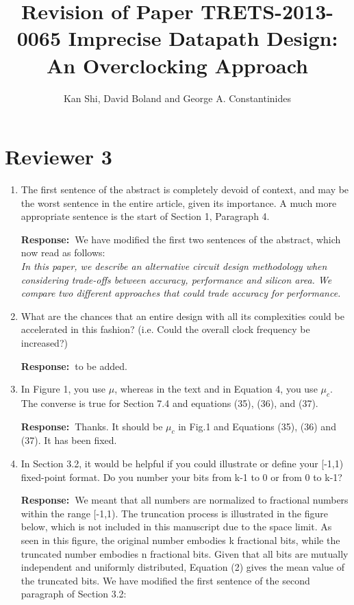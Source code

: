\documentclass[a4paper, 11pt]{article}
\title{Revision of Paper TRETS-2013-0065 Imprecise Datapath Design: An Overclocking Approach}
\author{Kan Shi, David Boland and George A. Constantinides}
\date{}
\def\Response{\noindent \textbf{Response:~}}
\newcommand{\Question}[1]{\textcolor[rgb]{0.51,0.00,0.00}{#1}}
\newcommand{\PaperText}[1]{\emph{#1}}
\begin{document}
\maketitle

\section*{Reviewer 3}
\begin{enumerate}
  \item \Question{The first sentence of the abstract is completely devoid of context, and may be the worst sentence in the entire article, given its importance. A much more appropriate sentence is the start of Section 1, Paragraph 4.}
            
      \Response We have modified the first two sentences of the abstract, which now read as follows:\\
           
      \PaperText{In this paper, we describe an alternative circuit design methodology when considering trade-offs between accuracy, performance and silicon area. We compare two different approaches that could trade accuracy for performance.}\\

  \item \Question{What are the chances that an entire design with all its complexities could be accelerated in this fashion? (i.e. Could the overall clock frequency be increased?)}
            
      \Response to be added.\\
      
  \item \Question{In Figure 1, you use $\mu$, whereas in the text and in Equation 4, you use $\mu_c$.  The converse is true for Section 7.4 and equations (35), (36), and (37).}
      
      \Response Thanks. It should be $\mu_c$ in Fig.1 and Equations (35), (36) and (37). It has been fixed.\\
      
  \item \Question{In Section 3.2, it would be helpful if you could illustrate or define your [-1,1) fixed-point format. Do you number your bits from k-1 to 0 or from 0 to k-1?}
      
      \Response We meant that all numbers are normalized to fractional numbers within the range [-1,1). The truncation process is illustrated in the figure below, which is not included in this manuscript due to the space limit. As seen in this figure, the original number embodies k fractional bits, while the truncated number embodies n fractional bits. Given that all bits are mutually independent and uniformly distributed, Equation (2) gives the mean value of the truncated bits. We have modified the first sentence of the second paragraph of Section 3.2:\\
      

\end{enumerate}
\end{document}
